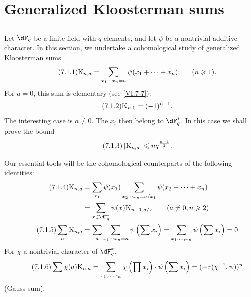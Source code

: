 \documentclass[oneside]{book}
\newcounter{char}
\newcommand{\kloos}{\textnormal{K}} %
\theoremstyle{sga-source}
\theoremstyle{sga-source-dash}
\theoremstyle{sga-source-dotdash}
\theoremstyle{sga-source-number-note-dash}
\theoremstyle{sga-source-note-number-dotdash}
\theoremstyle{sga-source-example-dotdash}
\theoremstyle{sga-source-inline-number}
\theoremstyle{sga-source-bare-number}
\theoremstyle{sga-source}
\newcommand{\PrintPage}[1]{}\newcommand{\MathPage}[1]{}\newcommand{\PrintCite}[2]{#1}\newcommand{\var}[3]{#1}
\begin{document}
\PrintPage{219}
\section{Generalized Kloosterman sums}\label{VI:7}





\subsection{}\label{VI:7-1}

Let $\dF_q$ be a finite field with $q$ elements, and let $\psi$ be a nontrivial 
additive character. In this section, we undertake a cohomological study of 
generalized Kloosterman sums 
\begin{equation*}\tag{7.1.1}\label{VI:eq:7-1-1}
  \kloos_{n,a} = \sum_{x_1\dotsm x_n = a} \psi(x_1+\cdots + x_n) \qquad (n\geqslant 1) \text{.} 
\end{equation*}
For $a=0$, this sum is elementary (see \ref{VI:7-7}): 
\begin{equation*}\tag{7.1.2}\label{VI:eq:7-1-2}
  \kloos_{n,0} = (-1)^{n-1} \text{.} 
\end{equation*}
The interesting case is $a\ne 0$. The $x_i$ then belong to 
$\dF_q^\ast$. In this case we shall prove the bound 
\begin{equation*}\tag{7.1.3}\label{VI:eq:7-1-3}
  \left|\kloos_{n,a}\right| \leqslant n q^{\frac{n-1}{2}} \text{.} 
\end{equation*}

Our essential tools will be the cohomological counterparts of the 
following identities: 
\begin{align*}\tag{7.1.4}\label{VI:eq:7-1-4}
  \kloos_{n,a} &= \sum_{x_1} \psi(x_1) \sum_{x_2\dotsm x_n = a/x_1} \psi(x_2+\cdots + x_n) \\ \notag
    &= \sum_{x\in \dF_q^\ast} \psi(x) \kloos_{n-1,a/x} \qquad (a\ne 0,n\geqslant 2) \\ \tag{7.1.5}\label{VI:eq:7-1-5}
  \sum_a \kloos_{n,a} &= \sum_a \sum_{x_1 \dotsm x_n = a} \psi\left(\sum x_i\right) = \sum_{x_1,\dots,x_n} \psi\left(\sum x_i\right) = 0 
\end{align*}
For $\chi$ a nontrivial character of $\dF_q^\ast$, 
\begin{equation*}\tag{7.1.6}\label{VI:eq:7-1-6}
  \sum \chi(a) \kloos_{n,a} = \sum_{x_1,\dots,x_n} \chi\left(\prod x_i\right) \cdot \psi\left(\sum x_i\right) = (-\tau(\chi^{-1},\psi))^n 
\end{equation*}
(Gauss sum). 
\end{document}
